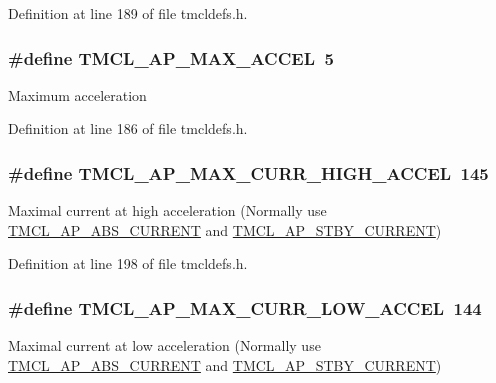 Definition at line 189 of file tmcldefs.h.\hypertarget{group__RWParam_ga5f18e570598b33d3d77b0d0894d81dc7}{
\subsubsection[{TMCL\_\-AP\_\-MAX\_\-ACCEL}]{\setlength{\rightskip}{0pt plus 5cm}\#define TMCL\_\-AP\_\-MAX\_\-ACCEL~5}}
\label{group__RWParam_ga5f18e570598b33d3d77b0d0894d81dc7}
Maximum acceleration 

Definition at line 186 of file tmcldefs.h.\hypertarget{group__RWParam_ga1a3faf0da53cb9d7cc2a84cc326ccc4a}{
\subsubsection[{TMCL\_\-AP\_\-MAX\_\-CURR\_\-HIGH\_\-ACCEL}]{\setlength{\rightskip}{0pt plus 5cm}\#define TMCL\_\-AP\_\-MAX\_\-CURR\_\-HIGH\_\-ACCEL~145}}
\label{group__RWParam_ga1a3faf0da53cb9d7cc2a84cc326ccc4a}
Maximal current at high acceleration (Normally use \hyperlink{group__RWParam_gaaf8d5010f2cf9799b5321358b5f5fb35}{TMCL\_\-AP\_\-ABS\_\-CURRENT} and \hyperlink{group__RWParam_ga7e4a74f86decbbced917fb7825aef450}{TMCL\_\-AP\_\-STBY\_\-CURRENT}) 

Definition at line 198 of file tmcldefs.h.\hypertarget{group__RWParam_gad989938d2101b5e000d5f41ca1d2a522}{
\subsubsection[{TMCL\_\-AP\_\-MAX\_\-CURR\_\-LOW\_\-ACCEL}]{\setlength{\rightskip}{0pt plus 5cm}\#define TMCL\_\-AP\_\-MAX\_\-CURR\_\-LOW\_\-ACCEL~144}}
\label{group__RWParam_gad989938d2101b5e000d5f41ca1d2a522}
Maximal current at low acceleration (Normally use \hyperlink{group__RWParam_gaaf8d5010f2cf9799b5321358b5f5fb35}{TMCL\_\-AP\_\-ABS\_\-CURRENT} and \hyperlink{group__RWParam_ga7e4a74f86decbbced917fb7825aef450}{TMCL\_\-AP\_\-STBY\_\-CURRENT}) 

